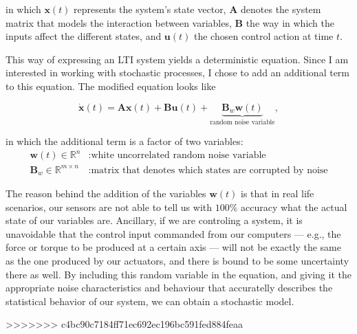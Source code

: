\documentclass[12pt]{article}
\begin{document}
in which ${\mathbf{x}}(t)$ represents the system's state vector, $\mathbf{A}$ denotes the system matrix that models the interaction between variables, $\mathbf{B}$ the way in which the inputs affect the different states, and $\mathbf{u}(t)$ the chosen control action at time $t$.

This way of expressing an LTI system yields a deterministic equation. Since I am interested in working with stochastic processes, I chose to add an additional term to this equation. The modified equation  looks like

\begin{equation}\label{eq:ltiSysStochastic}
\dot{\mathbf{x}}(t) = \mathbf{A} \mathbf{x}(t) + \mathbf{B} \mathbf{u}(t) + \underbrace{ \mathbf{B}_w \mathbf{w}(t)}_{\text{random noise variable}},
\end{equation}

in which the additional term is a factor of two variables:
\begin{align*}
\mathbf{w}(t) \in \mathbb{R}^{n} &: \text{white uncorrelated random noise variable} \\
\mathbf{B}_w \in \mathbb{R}^{m\times n} &: \text{matrix that denotes which states are corrupted by noise}
\end{align*}


The reason behind the addition of the variables $\mathbf{w}(t)$ is that in real life scenarios, our sensors are not able to tell us with $100\%$ accuracy what the actual state of our variables are. Ancillary, if we are controling a system, it is unavoidable that the control input commanded from our computers --- e.g., the force or torque to be produced at a certain axis --- will not be exactly the same as the one produced by our actuators, and there is bound to be some uncertainty there as well. By including this random variable in the equation, and giving it the appropriate noise characteristics and behaviour that accuratelly describes the statistical behavior of our system, we can obtain a stochastic model.

>>>>>>> c4bc90c7184ff71ec692ec196bc591fed884feaa
 
\end{document}

